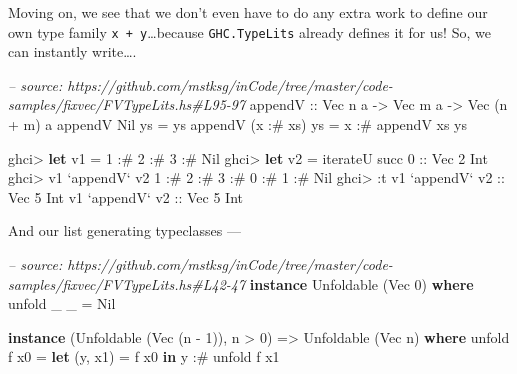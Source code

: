 \documentclass[]{article}
\newenvironment{Shaded}{\begin{snugshade}}{\end{snugshade}}
\newcommand{\CommentTok}[1]{\textcolor[rgb]{0.56,0.35,0.01}{\textit{#1}}}
\newcommand{\DataTypeTok}[1]{\textcolor[rgb]{0.13,0.29,0.53}{#1}}
\newcommand{\DecValTok}[1]{\textcolor[rgb]{0.00,0.00,0.81}{#1}}
\newcommand{\FunctionTok}[1]{\textcolor[rgb]{0.00,0.00,0.00}{#1}}
\newcommand{\KeywordTok}[1]{\textcolor[rgb]{0.13,0.29,0.53}{\textbf{#1}}}
\newcommand{\NormalTok}[1]{#1}
\newcommand{\OtherTok}[1]{\textcolor[rgb]{0.56,0.35,0.01}{#1}}
\begin{document}
Moving on, we see that we don't even have to do any extra work to define our own
type family \texttt{x\ +\ y}\ldots{}because \texttt{GHC.TypeLits} already
defines it for us! So, we can instantly write\ldots{}.

\begin{Shaded}
\begin{Highlighting}[]
\CommentTok{-- source: https://github.com/mstksg/inCode/tree/master/code-samples/fixvec/FVTypeLits.hs#L95-97}
\OtherTok{appendV ::} \DataTypeTok{Vec}\NormalTok{ n a }\OtherTok{->} \DataTypeTok{Vec}\NormalTok{ m a }\OtherTok{->} \DataTypeTok{Vec}\NormalTok{ (n }\FunctionTok{+}\NormalTok{ m) a}
\NormalTok{appendV }\DataTypeTok{Nil}\NormalTok{       ys }\FunctionTok{=}\NormalTok{ ys}
\NormalTok{appendV (x }\FunctionTok{:#}\NormalTok{ xs) ys }\FunctionTok{=}\NormalTok{ x }\FunctionTok{:#}\NormalTok{ appendV xs ys}
\end{Highlighting}
\end{Shaded}

\begin{Shaded}
\begin{Highlighting}[]
\NormalTok{ghci}\FunctionTok{>} \KeywordTok{let}\NormalTok{ v1 }\FunctionTok{=} \DecValTok{1} \FunctionTok{:#} \DecValTok{2} \FunctionTok{:#} \DecValTok{3} \FunctionTok{:#} \DataTypeTok{Nil}
\NormalTok{ghci}\FunctionTok{>} \KeywordTok{let}\NormalTok{ v2 }\FunctionTok{=}\NormalTok{ iterateU succ }\DecValTok{0}\OtherTok{ ::} \DataTypeTok{Vec} \DecValTok{2} \DataTypeTok{Int}
\NormalTok{ghci}\FunctionTok{>}\NormalTok{ v1 }\OtherTok{`appendV`}\NormalTok{ v2}
\DecValTok{1} \FunctionTok{:#} \DecValTok{2} \FunctionTok{:#} \DecValTok{3} \FunctionTok{:#} \DecValTok{0} \FunctionTok{:#} \DecValTok{1} \FunctionTok{:#} \DataTypeTok{Nil}
\NormalTok{ghci}\FunctionTok{>} \FunctionTok{:}\NormalTok{t v1 }\OtherTok{`appendV` v2 ::} \DataTypeTok{Vec} \DecValTok{5} \DataTypeTok{Int}
\NormalTok{v1 }\OtherTok{`appendV` v2 ::} \DataTypeTok{Vec} \DecValTok{5} \DataTypeTok{Int}
\end{Highlighting}
\end{Shaded}

And our list generating typeclasses ---

\begin{Shaded}
\begin{Highlighting}[]
\CommentTok{-- source: https://github.com/mstksg/inCode/tree/master/code-samples/fixvec/FVTypeLits.hs#L42-47}
\KeywordTok{instance} \DataTypeTok{Unfoldable}\NormalTok{ (}\DataTypeTok{Vec} \DecValTok{0}\NormalTok{) }\KeywordTok{where}
\NormalTok{    unfold _ _ }\FunctionTok{=} \DataTypeTok{Nil}

\KeywordTok{instance}\NormalTok{ (}\DataTypeTok{Unfoldable}\NormalTok{ (}\DataTypeTok{Vec}\NormalTok{ (n }\FunctionTok{-} \DecValTok{1}\NormalTok{)), n }\FunctionTok{>} \DecValTok{0}\NormalTok{) }\OtherTok{=>} \DataTypeTok{Unfoldable}\NormalTok{ (}\DataTypeTok{Vec}\NormalTok{ n) }\KeywordTok{where}
\NormalTok{    unfold f x0 }\FunctionTok{=} \KeywordTok{let}\NormalTok{ (y, x1) }\FunctionTok{=}\NormalTok{ f x0}
                  \KeywordTok{in}\NormalTok{  y }\FunctionTok{:#}\NormalTok{ unfold f x1}
\end{Highlighting}
\end{Shaded}
\end{document}
